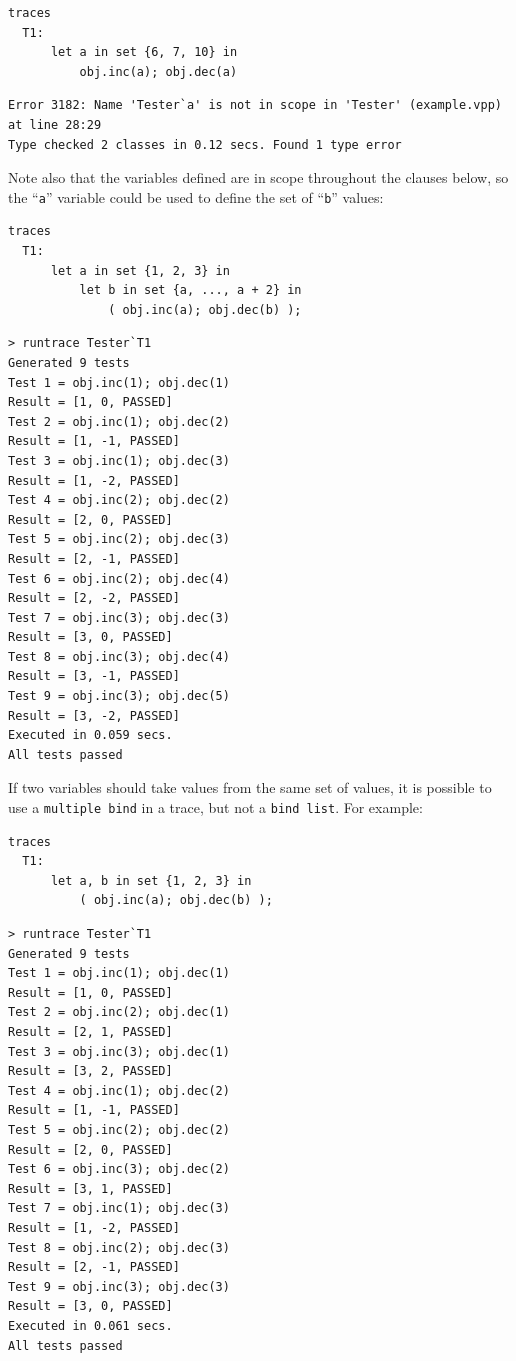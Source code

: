 \documentclass{overturerepchap}
\begin{document}
\small
\begin{lstlisting}
traces
  T1:
      let a in set {6, 7, 10} in
          obj.inc(a); obj.dec(a)
\end{lstlisting}
\scriptsize
\lstset{style=tool,language=}
\begin{lstlisting}[escapechar=@]
Error 3182: Name 'Tester`a' is not in scope in 'Tester' (example.vpp) at line 28:29
Type checked 2 classes in 0.12 secs. Found 1 type error
\end{lstlisting}
\lstset{style=mystyle}
\lstset{language=VDM++}
\normalsize

\noindent Note also that the variables defined are in scope
throughout the clauses below, so the ``\texttt{a}'' variable could be used to define the
set of ``\texttt{b}'' values:

\small
\begin{lstlisting}
traces
  T1:
      let a in set {1, 2, 3} in
          let b in set {a, ..., a + 2} in
              ( obj.inc(a); obj.dec(b) );
\end{lstlisting}

\lstset{style=tool,language=}
\begin{lstlisting}[escapechar=@]
> runtrace Tester`T1
Generated 9 tests
Test 1 = obj.inc(1); obj.dec(1)
Result = [1, 0, PASSED]
Test 2 = obj.inc(1); obj.dec(2)
Result = [1, -1, PASSED]
Test 3 = obj.inc(1); obj.dec(3)
Result = [1, -2, PASSED]
Test 4 = obj.inc(2); obj.dec(2)
Result = [2, 0, PASSED]
Test 5 = obj.inc(2); obj.dec(3)
Result = [2, -1, PASSED]
Test 6 = obj.inc(2); obj.dec(4)
Result = [2, -2, PASSED]
Test 7 = obj.inc(3); obj.dec(3)
Result = [3, 0, PASSED]
Test 8 = obj.inc(3); obj.dec(4)
Result = [3, -1, PASSED]
Test 9 = obj.inc(3); obj.dec(5)
Result = [3, -2, PASSED]
Executed in 0.059 secs. 
All tests passed
\end{lstlisting}
\lstset{style=mystyle}
\lstset{language=VDM++}
\normalsize

\noindent If two variables should take values from the same set of values, it is possible
to use a \texttt{multiple bind} in a trace, but not a \texttt{bind list}. For
example:

\small
\begin{lstlisting}
traces
  T1:
      let a, b in set {1, 2, 3} in
          ( obj.inc(a); obj.dec(b) );
\end{lstlisting}

\lstset{style=tool,language=}
\begin{lstlisting}[escapechar=@]
> runtrace Tester`T1
Generated 9 tests
Test 1 = obj.inc(1); obj.dec(1)
Result = [1, 0, PASSED]
Test 2 = obj.inc(2); obj.dec(1)
Result = [2, 1, PASSED]
Test 3 = obj.inc(3); obj.dec(1)
Result = [3, 2, PASSED]
Test 4 = obj.inc(1); obj.dec(2)
Result = [1, -1, PASSED]
Test 5 = obj.inc(2); obj.dec(2)
Result = [2, 0, PASSED]
Test 6 = obj.inc(3); obj.dec(2)
Result = [3, 1, PASSED]
Test 7 = obj.inc(1); obj.dec(3)
Result = [1, -2, PASSED]
Test 8 = obj.inc(2); obj.dec(3)
Result = [2, -1, PASSED]
Test 9 = obj.inc(3); obj.dec(3)
Result = [3, 0, PASSED]
Executed in 0.061 secs. 
All tests passed
\end{lstlisting}
\lstset{style=mystyle}
\lstset{language=VDM++}
\normalsize
\end{document}
